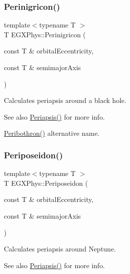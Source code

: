 \subsubsection{\texorpdfstring{Perinigricon()}{Perinigricon()}}
{\footnotesize\ttfamily template$<$typename T $>$ \\
T E\+G\+X\+Phys\+::\+Perinigricon (\begin{DoxyParamCaption}\item[{const T \&}]{orbital\+Eccentricity,  }\item[{const T \&}]{semimajor\+Axis }\end{DoxyParamCaption})}



Calculates periapsis around a black hole. 

\begin{DoxySeeAlso}{See also}
\mbox{\hyperlink{group___periapsis_ga4414ac75539371ec874a3d25cad6c9fe}{Periapsis()}} for more info. 

\mbox{\hyperlink{group___periapsis_gada5892309279a3a687c4eb2f88238e4e}{Peribothron()}} alternative name. 
\end{DoxySeeAlso}
\mbox{\label{group___periapsis_ga237e7af3794202c67e65f64f4c8abc2a}} 
\subsubsection{\texorpdfstring{Periposeidon()}{Periposeidon()}}
{\footnotesize\ttfamily template$<$typename T $>$ \\
T E\+G\+X\+Phys\+::\+Periposeidon (\begin{DoxyParamCaption}\item[{const T \&}]{orbital\+Eccentricity,  }\item[{const T \&}]{semimajor\+Axis }\end{DoxyParamCaption})}



Calculates periapsis around Neptune. 

\begin{DoxySeeAlso}{See also}
\mbox{\hyperlink{group___periapsis_ga4414ac75539371ec874a3d25cad6c9fe}{Periapsis()}} for more info. 
\end{DoxySeeAlso}
\mbox{\label{group___periapsis_ga60a50d09d29ebe47cbbfc125c2ea42bf}} 
